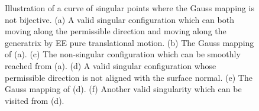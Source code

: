 \documentclass[Afour,sageh,times]{sagej}
\begin{document}
\begin{figure}[t]
\centering
{}
\caption{Illustration of a curve of singular points where the Gauss mapping is not bijective. (a) A valid singular configuration which can both moving along the permissible direction and moving along the generatrix by EE pure translational motion. (b) The Gauss mapping of (a). (c) The non-singular configuration which can be smoothly reached from (a). 
(d) A valid singular configuration whose permissible direction is not aligned with the surface normal. (e) The Gauss mapping of (d). (f) Another valid singularity which can be visited from (d). 
}\label{fig:curved}
\end{figure}
\end{document}
